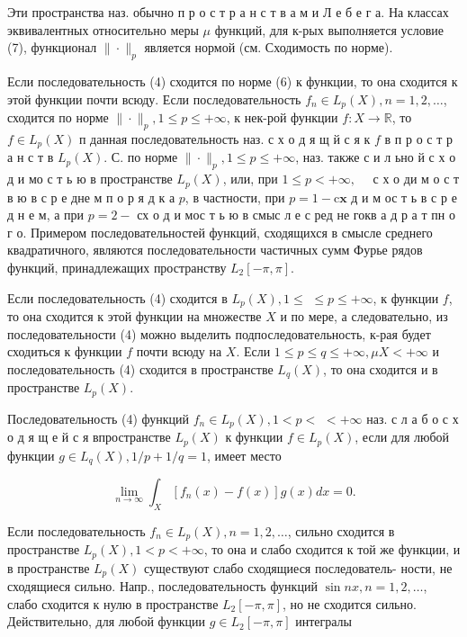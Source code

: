 \documentclass[10pt]{article}
\begin{document}
Эти пространства наз. обычно п р о с т р а н с т в а м и Л е б е г а. На классах эквивалентных относительно меры $\mu$ функций, для к-рых выполняется условие (7), функционал $\|\cdot\|_{p}$ является нормой (см. Сходимость по норме).



Если последовательность (4) сходится по норме (6) к функции, то она сходится к этой функции почти всюду. Если последовательность $f_{n} \in L_{p}(X), n=1,2, \ldots$, сходится по норме $\|\cdot\|_{p}, 1 \leqslant p \leqslant+\infty$, к нек-рой функции $f: X \rightarrow \mathbb{R}$, то $f \in L_{p}(X)$ п данная последовательность наз. с х о д я щ й с я к $f$ в п р о с т р а н с т в $L_{p}(X)$. С. по норме $\|\cdot\|_{p}, 1 \leqslant p \leqslant+\infty$, наз. также с и л ьно й с х о д и мо с т ь ю в пространстве $L_{p}(X)$, или, при $1 \leqslant p<+\infty, \quad$ с х о ди м о с т в ю в с р е дне м п о р я д к а $p$, в частности, при $p=1-\mathrm{c} \mathbf{x}$ д и м ос т ь в с р е д н е м, а при $p=2-$ сх о д и мос т ь ю в смыс л е с ред не гокв а д р а т пн о г о. Примером последовательностей функций, сходящихся в смысле среднего квадратичного, являются последовательности частичных сумм Фурье рядов функций, принадлежащих пространству $L_{2}[-\pi, \pi]$.



Если последовательность (4) сходится в $L_{p}(X), 1 \leqslant$ $\leqslant p \leqslant+\infty$, к функции $f$, то она сходится к этой функции на множестве $X$ и по мере, а следовательно, из последовательности (4) можно выделить подпоследовательность, к-рая будет сходиться к функции $f$ почти всюду на $X$. Если $1 \leqslant p \leqslant q \leqslant+\infty, \mu X<+\infty$ и последовательность (4) сходится в пространстве $L_{q}(X)$, то она сходится и в пространстве $L_{p}(X)$.



Последовательность (4) функций $f_{n} \in L_{p}(X), 1<p<$ $<+\infty$ наз. с л а б о с х о д я щ е й с я впространстве $L_{p}(X)$ к функции $f \in L_{p}(X)$, если для любой функции $g \in L_{q}(X), 1 / p+1 / q=1$, имеет место



\[

\lim _{n \rightarrow \infty} \int_{X}\left[f_{n}(x)-f(x)\right] g(x) d x=0 .

\]



Если последовательность $f_{n} \in L_{p}(X), n=1,2, \ldots$, сильно сходится в пространстве $L_{p}(X), 1<p<+\infty$, то она и слабо сходится к той же функции, и в пространстве $L_{p}(X)$ существуют слабо сходящиеся последователь- ности, не сходящиеся сильно. Напр., последовательность функций $\sin n x, n=1,2, \ldots$, слабо сходится к нулю в пространстве $L_{2}[-\pi, \pi]$, но не сходится сильно. Действительно, для любой функции $g \in L_{2}[-\pi, \pi]$ интегралы
\end{document}
